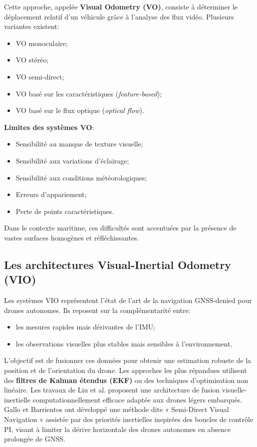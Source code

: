 \documentclass[12pt, a4paper, twoside, openright]{report}
\begin{document}
Cette approche, appelée \textbf{Visual Odometry (VO)}, consiste à déterminer le déplacement relatif d’un véhicule grâce à l’analyse des flux vidéo. Plusieurs variantes existent:
\begin{itemize}
    \item VO monoculaire;
    \item VO stéréo;
    \item VO semi-direct;
    \item VO basé sur les caractéristiques (\textit{feature-based});
    \item VO basé sur le flux optique (\textit{optical flow}).
\end{itemize}

\textbf{Limites des systèmes VO}:
\begin{itemize}
    \item Sensibilité au manque de texture visuelle;
    \item Sensibilité aux variations d’éclairage;
    \item Sensibilité aux conditions météorologiques;
    \item Erreurs d’appariement;
    \item Perte de points caractéristiques.
\end{itemize}

Dans le contexte maritime, ces difficultés sont accentuées par la présence de vastes surfaces homogènes et réfléchissantes.

\subsection{Les architectures Visual-Inertial Odometry (VIO)}
Les systèmes VIO représentent l’état de l’art de la navigation GNSS-denied pour drones autonomes. Ils reposent sur la complémentarité entre:
\begin{itemize}
    \item les mesures rapides mais dérivantes de l’IMU;
    \item les observations visuelles plus stables mais sensibles à l’environnement.
\end{itemize}

L’objectif est de fusionner ces données pour obtenir une estimation robuste de la position et de l’orientation du drone. Les approches les plus répandues utilisent des \textbf{filtres de Kalman étendus (EKF)} ou des techniques d’optimisation non linéaire.
Les travaux de Liu et al.\cite{liu2020visual} proposent une architecture de fusion visuelle-inertielle computationnellement efficace adaptée aux drones légers embarqués. Gallo et Barrientos \cite{gallo2023semi} ont développé une méthode dite « Semi-Direct Visual Navigation » assistée par des priorités inertielles inspirées des boucles de contrôle PI, visant à limiter la dérive horizontale des drones autonomes en absence prolongée de GNSS.
\end{document}
